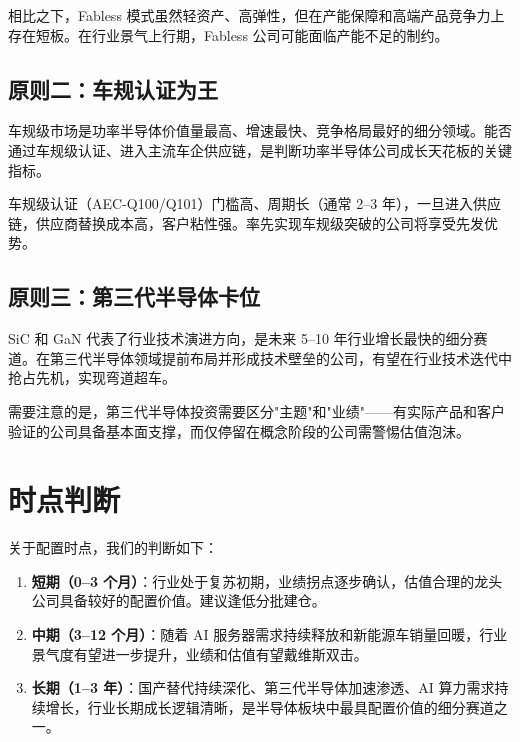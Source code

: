 相比之下，Fabless 模式虽然轻资产、高弹性，但在产能保障和高端产品竞争力上存在短板。在行业景气上行期，Fabless 公司可能面临产能不足的制约。

\subsection{原则二：车规认证为王}

车规级市场是功率半导体价值量最高、增速最快、竞争格局最好的细分领域。能否通过车规级认证、进入主流车企供应链，是判断功率半导体公司成长天花板的关键指标。

车规级认证（AEC-Q100/Q101）门槛高、周期长（通常 2–3 年），一旦进入供应链，供应商替换成本高，客户粘性强。率先实现车规级突破的公司将享受先发优势。

\subsection{原则三：第三代半导体卡位}

SiC 和 GaN 代表了行业技术演进方向，是未来 5–10 年行业增长最快的细分赛道。在第三代半导体领域提前布局并形成技术壁垒的公司，有望在行业技术迭代中抢占先机，实现弯道超车。

需要注意的是，第三代半导体投资需要区分"主题"和"业绩"——有实际产品和客户验证的公司具备基本面支撑，而仅停留在概念阶段的公司需警惕估值泡沫。

\section{时点判断}

关于配置时点，我们的判断如下：

\begin{enumerate}[leftmargin=2em]
\item \textbf{短期（0–3 个月）}：行业处于复苏初期，业绩拐点逐步确认，估值合理的龙头公司具备较好的配置价值。建议逢低分批建仓。
\item \textbf{中期（3–12 个月）}：随着 AI 服务器需求持续释放和新能源车销量回暖，行业景气度有望进一步提升，业绩和估值有望戴维斯双击。
\item \textbf{长期（1–3 年）}：国产替代持续深化、第三代半导体加速渗透、AI 算力需求持续增长，行业长期成长逻辑清晰，是半导体板块中最具配置价值的细分赛道之一。
\end{enumerate}


